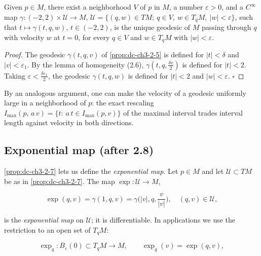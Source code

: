 \begin{proposition}
  \label{prop:dc-ch3-2-7}
  \notready
  Given $p\in M$, there exist a neighborhood $V$ of $p$ in $M$, a number
  $\varepsilon>0$, and a $C^\infty$ map $\gamma:(-2,2)\times\mathcal{U}\to M$,
  $\mathcal{U}=\{(q,w)\in TM;\ q\in V,\ w\in T_qM,\ |w|<\varepsilon\}$, such that
  $t\mapsto\gamma(t,q,w)$, $t\in(-2,2)$, is the unique geodesic of $M$ passing
  through $q$ with velocity $w$ at $t=0$, for every $q\in V$ and $w\in T_qM$ with
  $|w|<\varepsilon$.
\end{proposition}
\begin{proof}
  The geodesic $\gamma(t,q,v)$ of \cref{prop:dc-ch3-2-5} is defined for
  $|t|<\delta$ and $|v|<\varepsilon_1$. By the lemma of homogeneity (2.6),
  $\gamma(t,q,\frac{\delta v}{2})$ is defined for $|t|<2$. Taking
  $\varepsilon<\frac{\delta\varepsilon_1}{2}$, the geodesic $\gamma(t,q,w)$ is
  defined for $|t|<2$ and $|w|<\varepsilon$. $\square$
\end{proof}

\begin{remark}
  \label{rem:dc-ch3-2-8}
  \leanok
  By an analogous argument, one can make the velocity of a geodesic uniformly large
  in a neighborhood of $p$: the exact rescaling
  $I_{\max}(p,\,a\,v)=\{t:\ a\,t\in I_{\max}(p,v)\}$ of the maximal interval
  trades interval length against velocity in both directions.
\end{remark}

\subsection{Exponential map (after 2.8)}
\cref{prop:dc-ch3-2-7} lets us define the \emph{exponential map}. Let $p\in M$ and let
$\mathcal{U}\subset TM$ be as in \cref{prop:dc-ch3-2-7}. The map $\exp:\mathcal{U}\to M$,

$$
\exp(q,v)=\gamma(1,q,v)=\gamma\Big(|v|,q,\frac{v}{|v|}\Big),\quad(q,v)\in\mathcal{U},
$$

is the \emph{exponential map} on $\mathcal{U}$; it is differentiable. In applications
we use the restriction to an open set of $T_qM$:

$$
\exp_q:B_\varepsilon(0)\subset T_qM\to M,\qquad\exp_q(v)=\exp(q,v),
$$

